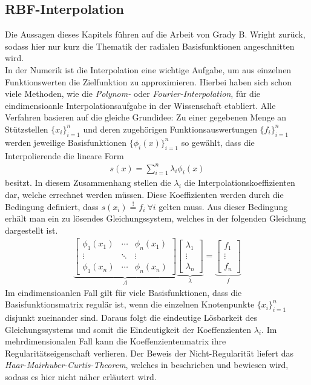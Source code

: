 \documentclass[12pt,titlepage]{article}
\begin{document}
\subsection{RBF-Interpolation}\label{sec:rbf_inter}
Die Aussagen dieses Kapitels führen auf die Arbeit von Grady B. Wright \cite{wright2003radial} zurück, sodass  hier nur kurz die Thematik der radialen Basisfunktionen angeschnitten wird.\\
In der Numerik ist die Interpolation eine wichtige Aufgabe, um aus einzelnen Funktionswerten die Zielfunktion zu approximieren. Hierbei haben sich schon viele Methoden, wie die \textit{Polynom-} oder \textit{Fourier-Interpolation}, für die eindimensioanle Interpolationsaufgabe in der Wissenschaft etabliert. Alle Verfahren basieren auf die gleiche Grundidee: Zu einer gegebenen Menge an Stützstellen $\{x_i\}_{i=1}^n$ und deren zugehörigen Funktionsauswertungen $\{f_i\}_{i=1}^n$ werden jeweilige Basisfunktionen $\{\phi_i(x)\}_{i=1}^n$ so gewählt, dass die Interpolierende die lineare Form
\begin{align}
 s(x)=\sum_{i=1}^n\lambda_i\phi_i(x)\nonumber
\end{align}
besitzt. In diesem Zusammenhang stellen die $\lambda_i$ die Interpolationskoeffizienten dar, welche errechnet werden müssen. Diese Koeffizienten werden durch die Bedingung definiert, dass $s(x_i)\overset{!}{=}f_i~\forall i$ gelten muss. Aus dieser Bedingung erhält man ein zu lösendes Gleichungssystem, welches in der folgenden Gleichung dargestellt ist.
\begin{align}
\underbrace{\begin{bmatrix}
 \phi_1(x_1) & \cdots & \phi_n(x_1) \\ \vdots & \ddots & \vdots \\ \phi_1(x_n) & \cdots & \phi_n(x_n)
\end{bmatrix}}_{A}
\underbrace{\begin{bmatrix}
 \lambda_1 \\ \vdots \\ \lambda_n
\end{bmatrix}}_{\lambda}
=
\underbrace{\begin{bmatrix}
 f_1 \\ \vdots \\ f_n
\end{bmatrix}}_{f}\label{eq:Intermatrix}
\end{align}
Im eindimensioanlen Fall gilt für viele Basisfunktionen, dass die Basisfunktionsmatrix regulär ist, wenn die einzelnen Knotenpunkte $\{x_i\}_{i=1}^n$ disjunkt zueinander sind. Daraus folgt die eindeutige Lösbarkeit des Gleichungssystems und somit die Eindeutigkeit der Koeffenzienten $\lambda_i$. Im mehrdimensionalen Fall kann die Koeffenzientenmatrix ihre Regularitätseigenschaft verlieren. Der Beweis der Nicht-Regularität liefert das \textit{Haar-Mairhuber-Curtis-Theorem}, welches in \cite{de2013four} beschrieben und bewiesen wird, sodass es hier nicht näher erläutert wird.\\
\end{document}
